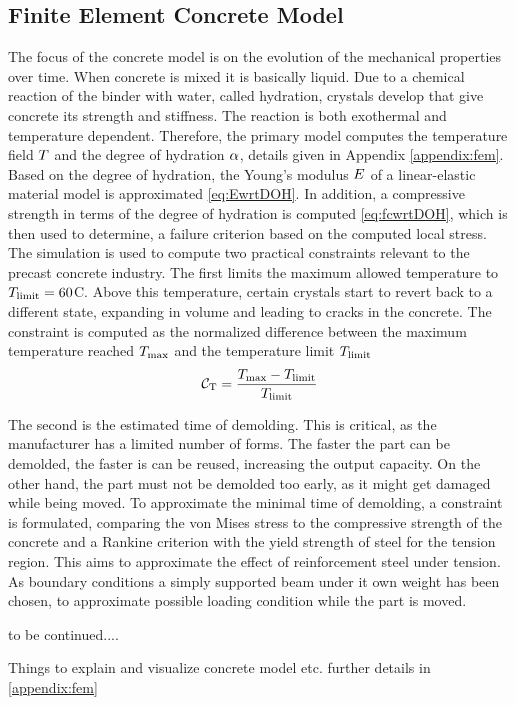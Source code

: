 \subsection{Finite Element Concrete Model}
The focus of the concrete model is on the evolution of the mechanical properties over time.
When concrete is mixed it is basically liquid.
Due to a  chemical reaction of the binder with water, called hydration, crystals develop that give concrete its strength and stiffness.
The reaction is both exothermal and temperature dependent.
Therefore, the primary model computes the temperature field $T$ and the degree of hydration $\alpha$, details given in Appendix \ref{appendix:fem}.
Based on the degree of hydration, the Young's modulus $E$ of a linear-elastic material model
is approximated \eqref{eq:EwrtDOH}.
In addition, a compressive strength in terms of the degree of hydration is computed \eqref{eq:fcwrtDOH}, which is then used to determine, a failure criterion based on the computed local stress.
The simulation is used to compute two practical constraints relevant to the precast concrete industry.
The first limits the maximum allowed temperature to $T_{\text{limit}} = 60$\textdegree C.
Above this temperature, certain crystals start to revert back to a different state, expanding in volume and leading to cracks in the concrete.
The constraint is computed as the normalized difference between the maximum temperature reached $T_{\text{max}}$ and the temperature limit $T_{\text{limit}}$ 
\begin{align}
\mathcal{C}_{\text{T}} = \frac{T_{\text{max}} - T_{\text{limit}}}{T_{\text{limit}}}
\end{align}


The second is the estimated time of demolding.
This is critical, as the manufacturer has a limited number of forms.
The faster the part can be demolded, the faster is can be reused, increasing the output capacity.
On the other hand, the part must not be demolded too early, as it might get damaged while being moved.
To approximate the minimal time of demolding, a constraint is formulated, comparing the von Mises stress to the compressive strength of the concrete and a Rankine criterion with the yield strength of steel for the tension region. 
This aims to approximate the effect of reinforcement steel under tension.
As boundary conditions a simply supported beam under it own weight has been chosen, to approximate possible loading condition while the part is moved.





to be continued....



Things to explain and visualize concrete model etc.
further details in \ref{appendix:fem}